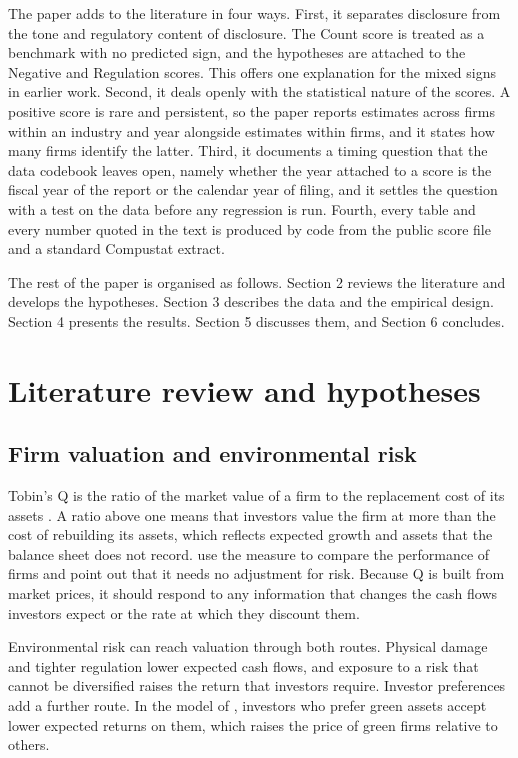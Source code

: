 \documentclass[12pt,a4paper]{article}
\begin{document}
The paper adds to the literature in four ways. First, it separates disclosure from the tone and regulatory content of disclosure. The Count score is treated as a benchmark with no predicted sign, and the hypotheses are attached to the Negative and Regulation scores. This offers one explanation for the mixed signs in earlier work. Second, it deals openly with the statistical nature of the scores. A positive score is rare and persistent, so the paper reports estimates across firms within an industry and year alongside estimates within firms, and it states how many firms identify the latter. Third, it documents a timing question that the data codebook leaves open, namely whether the year attached to a score is the fiscal year of the report or the calendar year of filing, and it settles the question with a test on the data before any regression is run. Fourth, every table and every number quoted in the text is produced by code from the public score file and a standard Compustat extract.

The rest of the paper is organised as follows. Section 2 reviews the literature and develops the hypotheses. Section 3 describes the data and the empirical design. Section 4 presents the results. Section 5 discusses them, and Section 6 concludes.

\section{Literature review and hypotheses}

\subsection{Firm valuation and environmental risk}

Tobin's Q is the ratio of the market value of a firm to the replacement cost of its assets \citep{tobin1969}. A ratio above one means that investors value the firm at more than the cost of rebuilding its assets, which reflects expected growth and assets that the balance sheet does not record. \citet{lang1994} use the measure to compare the performance of firms and point out that it needs no adjustment for risk. Because Q is built from market prices, it should respond to any information that changes the cash flows investors expect or the rate at which they discount them.

Environmental risk can reach valuation through both routes. Physical damage and tighter regulation lower expected cash flows, and exposure to a risk that cannot be diversified raises the return that investors require. Investor preferences add a further route. In the model of \citet{pastor2021}, investors who prefer green assets accept lower expected returns on them, which raises the price of green firms relative to others.
\end{document}
